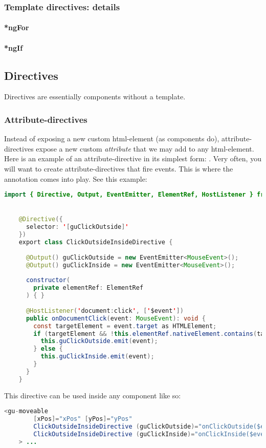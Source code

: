 \subsubsection{Template directives: details}

\paragraph{*ngFor}

\paragraph{*ngIf} 



\subsection{Directives}
Directives are essentially components without a template. 
\subsubsection{Attribute-directives}
Instead of exposing a new custom html-element (as components do), attribute-directives expose a new custom \emph{attribute} that we may add to any html-element. 
Here is an example of an attribute-directive in its simplest form: \href{}{}.
Very often, you will want to create attribute-directives that fire events. This is where the  annotation comes into play. See this example: 
\begin{lstlisting}[language=java]
    import { Directive, Output, EventEmitter, ElementRef, HostListener } from '@angular/core';


    @Directive({
      selector: '[guClickOutside]'
    })
    export class ClickOutsideInsideDirective {
      
      @Output() guClickOutside = new EventEmitter<MouseEvent>();
      @Output() guClickInside = new EventEmitter<MouseEvent>();
      
      constructor(
        private elementRef: ElementRef
      ) { }
    
      @HostListener('document:click', ['$event'])
      public onDocumentClick(event: MouseEvent): void {
        const targetElement = event.target as HTMLElement;
        if (targetElement && !this.elementRef.nativeElement.contains(targetElement)) {
          this.guClickOutside.emit(event);
        } else {
          this.guClickInside.emit(event);
        }
      }
    }
\end{lstlisting}
This directive can be used inside any component like so: 
\begin{lstlisting}[language=java]
    <gu-moveable 
        [xPos]="xPos" [yPos]="yPos"  
        ClickOutsideInsideDirective (guClickOutside)="onClickOutside($event)" 
        ClickOutsideInsideDirective (guClickInside)="onClickInside($event)"
    > ...
\end{lstlisting}


